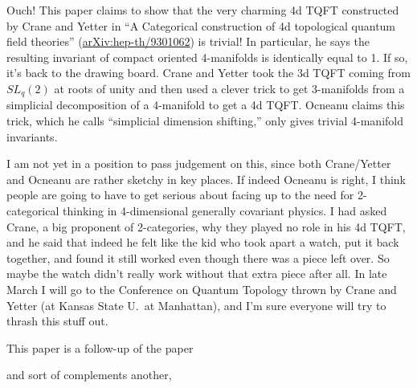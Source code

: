 Ouch! This paper claims to show that the very charming 4d TQFT constructed by Crane and Yetter in ``A Categorical construction of 4d topological quantum field theories'' (\href{https://arxiv.org/abs/hep-th/9301062}{arXiv:hep-th/9301062}) is trivial!  In particular, he says the resulting invariant of compact oriented 4-manifolds is identically equal to 1.  If so, it's back to the drawing board.  Crane and Yetter took the 3d TQFT coming from $SL_q(2)$ at roots of unity and then used a clever trick to get 3-manifolds from a simplicial decomposition of a 4-manifold to get a 4d TQFT.  Ocneanu claims this trick, which he calls ``simplicial dimension shifting,'' only gives trivial 4-manifold invariants.

I am not yet in a position to pass judgement on this, since both Crane/Yetter and Ocneanu are rather sketchy in key places.  If indeed Ocneanu is right, I think people are going to have to get serious about facing up to the need for 2-categorical thinking in 4-dimensional generally covariant physics.  I had asked Crane, a big proponent of 2-categories, why they played no role in his 4d TQFT, and he said that indeed he felt like the kid who took apart a watch, put it back together, and found it still worked even though there was a piece left over.  So maybe the watch didn't really work without that extra piece after all.  In late March I will go to the Conference on Quantum Topology thrown by Crane and Yetter (at Kansas State U.\ at Manhattan), and I'm sure everyone will try to thrash this stuff out.


This paper is a follow-up of the paper


and sort of complements another,


